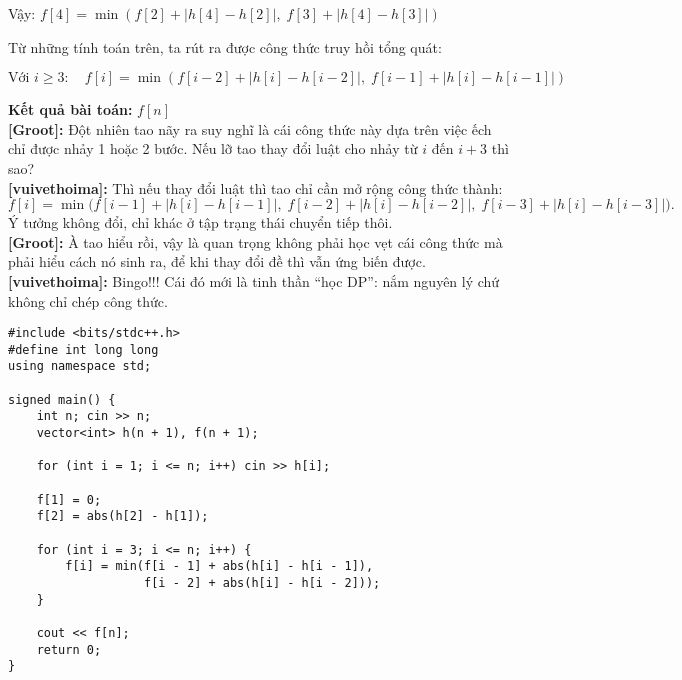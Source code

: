 Vậy: $ f[4] = \min \left( f[2] + |h[4] - h[2]|, \; f[3] + |h[4] - h[3]| \right) $


Từ những tính toán trên, ta rút ra được công thức truy hồi tổng quát:

\[
\text{Với } i \geq 3: \quad f[i] = \min \left( f[i - 2] + |h[i] - h[i-2]|, \; f[i - 1] + |h[i] - h[i-1]| \right)
\]

\textbf{Kết quả bài toán:} $f[n]$\\

\textbf{[Groot]:} Đột nhiên tao nãy ra suy nghĩ là cái công thức này dựa trên việc ếch chỉ được nhảy 1 hoặc 2 bước. Nếu lỡ tao thay đổi luật cho nhảy từ $i$ đến $i + 3$ thì sao?\\

\textbf{[vuivethoima]:} Thì nếu thay đổi luật thì tao chỉ cần mở rộng công thức thành:
\[
f[i] = \min \Big( 
    f[i-1] + |h[i] - h[i-1]|,\;
    f[i-2] + |h[i] - h[i-2]|,\;
    f[i-3] + |h[i] - h[i-3]|
\Big).
\]
Ý tưởng không đổi, chỉ khác ở tập trạng thái chuyển tiếp thôi.\\

\textbf{[Groot]:} À tao hiểu rồi, vậy là quan trọng không phải học vẹt cái công thức mà phải hiểu cách nó sinh ra, để khi thay đổi đề thì vẫn ứng biến được.\\

\textbf{[vuivethoima]:} Bingo!!! Cái đó mới là tinh thần ``học DP'': nắm nguyên lý chứ không chỉ chép công thức. 

\begin{lstlisting}[title=\centering \textbf{Cài đặt}]
#include <bits/stdc++.h>
#define int long long
using namespace std;

signed main() {
    int n; cin >> n;
    vector<int> h(n + 1), f(n + 1);

    for (int i = 1; i <= n; i++) cin >> h[i];

    f[1] = 0;
    f[2] = abs(h[2] - h[1]);

    for (int i = 3; i <= n; i++) {
        f[i] = min(f[i - 1] + abs(h[i] - h[i - 1]),
                   f[i - 2] + abs(h[i] - h[i - 2]));
    }

    cout << f[n];
    return 0;
}
\end{lstlisting}

